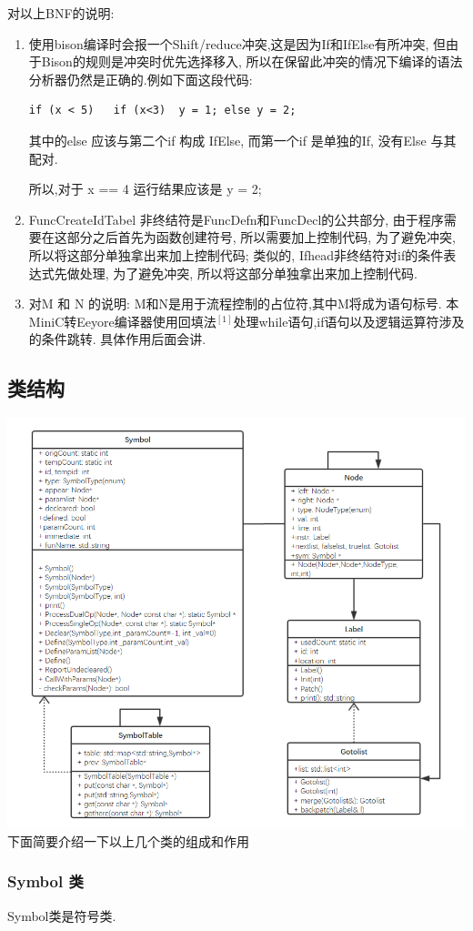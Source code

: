 \documentclass[UTF8]{article}
\begin{document}
对以上BNF的说明:
\begin{enumerate}[(1)]
\item 使用bison编译时会报一个Shift/reduce冲突,这是因为If和IfElse有所冲突, 但由于Bison的规则是冲突时优先选择移入, 所以在保留此冲突的情况下编译的语法分析器仍然是正确的.例如下面这段代码:
\begin{lstlisting}
if (x < 5)   if (x<3)  y = 1; else y = 2; 
\end{lstlisting}
其中的else 应该与第二个if 构成 IfElse, 而第一个if 是单独的If, 没有Else 与其配对.

所以,对于 x == 4 运行结果应该是 y = 2;
\item FuncCreateIdTabel 非终结符是FuncDefn和FuncDecl的公共部分, 由于程序需要在这部分之后首先为函数创建符号, 所以需要加上控制代码, 为了避免冲突, 所以将这部分单独拿出来加上控制代码; 类似的, Ifhead非终结符对if的条件表达式先做处理, 为了避免冲突, 所以将这部分单独拿出来加上控制代码.
\item 对M 和 N 的说明: M和N是用于流程控制的占位符,其中M将成为语句标号. 本MiniC转Eeyore编译器使用回填法$^{[1]}$处理while语句,if语句以及逻辑运算符涉及的条件跳转. 具体作用后面会讲.
\end{enumerate}
\subsection{类结构}
\includegraphics[width=\linewidth]{uml_eeyore} 
下面简要介绍一下以上几个类的组成和作用
\subsubsection{Symbol 类}
Symbol类是符号类.
\end{document}
